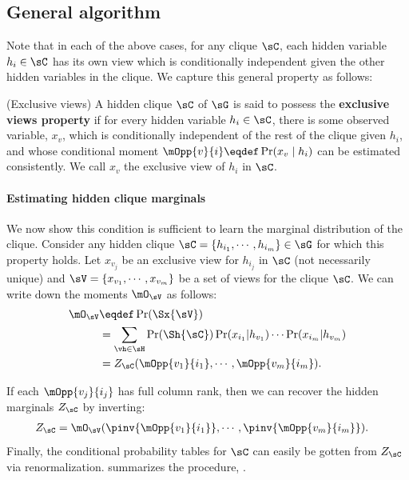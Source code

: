 \subsection{General algorithm}
\label{sec:directedGeneral}

Note that in each of the above cases,
  for any clique $\sC$, each hidden variable $h_i \in \sC$ has its own
  view which is conditionally independent given the other hidden variables in
  the clique.
We capture this general property as follows:
\begin{property}(Exclusive views)
  \label{prop:exclusive-views}
  A hidden clique $\sC$ of $\sG$ is said to possess the \textbf{exclusive views
  property} if for every hidden variable $h_i \in \sC$,
  there is some observed variable, $x_{v}$, which is conditionally
  independent of the rest of the clique given $h_i$,
  and whose conditional
  moment $\mOpp{v}{i} \eqdef \Pr(x_{v} \mid h_i)$ can be estimated consistently.
We call $x_v$ the exclusive view of $h_i$ in $\sC$.
\end{property}

\paragraph{Estimating hidden clique marginals}

We now show this condition is sufficient to learn the marginal
  distribution of the clique.
Consider any hidden clique $\sC = \{h_{i_1}, \cdots, h_{i_m}\} \in \sG$ for which this property holds. Let
  $x_{v_j}$ be an exclusive view for $h_{i_j}$ in $\sC$ (not necessarily unique) and $\sV
  = \{x_{v_1}, \cdots, x_{v_m}\}$ be a set of views for the clique $\sC$.
We can write down the moments $\mO_\sV$ as follows:
\begin{align*}
  \mO_\sV 
  &\eqdef \Pr(\Sx{\sV}) \\
      &= \sum_{\vh \in \sH} \Pr(\Sh{\sC}) 
          \Pr(x_{i_1} | h_{v_1}) \cdots \Pr(x_{i_m} | h_{v_m}) \\
    &= Z_{\sC}(\mOpp{v_1}{i_1},\cdots,\mOpp{v_m}{i_m}).
\end{align*}

If each $\mOpp{v_j}{i_j}$ has full column rank, then we can recover the
hidden marginals $Z_\sC$ by inverting:
\begin{align*}
  Z_{\sC} &= \mO_\sV(\pinv{\mOpp{v_1}{i_1}},\cdots,\pinv{\mOpp{v_m}{i_m}}).
\end{align*}
Finally, the conditional probability tables for $\sC$ can easily be gotten from
  $Z_\sC$ via renormalization.
 summarizes the procedure, \LearnClique.

